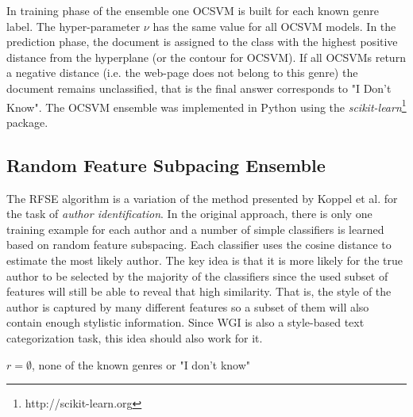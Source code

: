 \hfill \break


In training phase of the ensemble one OCSVM is built for each known genre label. The hyper-parameter $\nu$ has the same value for all OCSVM models. In the prediction phase, the document is assigned to the class with the highest positive distance from the hyperplane (or the contour for OCSVM). If all OCSVMs return a negative distance (i.e. the web-page does not belong to this genre) the document remains unclassified, that is the final answer corresponds to "I Don't Know". The OCSVM ensemble was implemented in Python using the \textit{scikit-learn}\footnote{http://scikit-learn.org} package.

\subsection{Random Feature Subpacing Ensemble}\label{sec:RFSE_Description}

The RFSE algorithm is a variation of the method presented by Koppel et al.  for the task of \textit{author identification}. In the original approach, there is only one training example for each author and a number of simple classifiers is learned based on random feature subspacing. Each classifier uses the cosine distance to estimate the most likely author. The key idea is that it is more likely for the true author to be selected by the majority of the classifiers since the used subset of features will still be able to reveal that high similarity. That is, the style of the author is captured by many different features so a subset of them will also contain enough stylistic information. Since WGI is also a style-based text categorization task, this idea should also work for it.

\hfill \break

\begin{algorithm}[H]
\caption{The \textit{RFSE} algorithm.}\label{alg:RFS-Ensemble}

{
      $r = \emptyset$, none of the known genres or "I don't know"\;
}
\end{algorithm}

